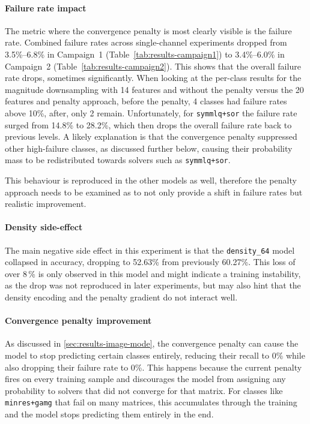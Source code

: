 \paragraph{Failure rate impact}
The metric where the convergence penalty is most clearly visible is the failure rate.
Combined failure rates across single-channel experiments dropped from 3.5\%--6.8\% in Campaign~1 (Table~\ref{tab:results-campaign1}) to
3.4\%--6.0\% in Campaign~2 (Table~\ref{tab:results-campaign2}).
This shows that the overall failure rate drops, sometimes significantly.
When looking at the per-class results for the magnitude downsampling with 14 features and without the penalty versus the
20 features and penalty approach, before the penalty, 4 classes had failure rates above 10\%, after, only 2 remain.
Unfortunately, for \texttt{symmlq+sor} the failure rate surged from 14.8\% to 28.2\%, which then drops
the overall failure rate back to previous levels.
A likely explanation is that the convergence penalty suppressed other high-failure classes, as discussed further below,
causing their probability mass to be redistributed towards solvers such as \texttt{symmlq+sor}.

This behaviour is reproduced in the other models as well, therefore the penalty approach needs to be examined as to
not only provide a shift in failure rates but realistic improvement.

\paragraph{Density side-effect}
The main negative side effect in this experiment is that the \texttt{density\_64} model collapsed in accuracy, dropping to 52.63\% from previously 60.27\%.
This loss of over 8\,\% is only observed in this model and might indicate a training instability, as the drop was not reproduced in later experiments,
but may also hint that the density encoding and the penalty gradient do not interact well.

\paragraph{Convergence penalty improvement}
As discussed in \autoref{sec:results-image-mode}, the convergence penalty can cause the model to stop predicting certain classes entirely,
reducing their recall to 0\% while also dropping their failure rate to 0\%.
This happens because the current penalty fires on every training sample and discourages the model from assigning any probability to solvers that
did not converge for that matrix.
For classes like \texttt{minres+gamg} that fail on many matrices, this accumulates through the training and the model stops predicting them entirely in the end.

